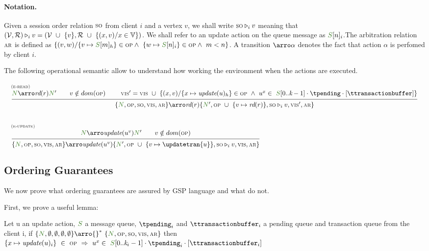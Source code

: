\documentclass[envcountsect,runningheads,orivec]{llncs}
\begin{document}
 \paragraph{Notation.} Given a session order relation $\textsc{\scriptsize{SO}}$ from client $i$ and a vertex $v$, we shall write $\textsc{\scriptsize{SO}}\triangleright_i{v}$  meaning that $(\mathcal{V}, \mathcal{R})\triangleright_i{v} = (\mathcal{V} \ \cup \ \{v\}, \mathcal{R}\ \cup \ \{(x,v) / x \in \mathbb{V}\})$. We shall refer to an update action on the queue message as $\updateinqueuemessage{n}{i}$.The arbitration relation $\textsc{\scriptsize{AR}}$ is defined as $\{ (v,w) / \{v \mapsto \updateinqueuemessage{m}{h}\} \in \op \land \ \{w \mapsto \updateinqueuemessage{n}{i} \} \in \op \land \ m < n \}$. A transition $\arroi{\alpha}$ denotes the fact that action $\alpha$ is perfomed by client $i$.

 
The following operational semantic allow to understand how working the environment when the actions are executed.

 \[
 \begin{array}{l}
		
\mathrule{e-read}{\systemterm \arroi{\readtran{r}} \systemterm' \qquad v \notin 
dom(\op) \qquad \ \vis' = \vis \ \cup \ \{ (x,v) / \{x \mapsto \updatebyclient{h}\} \in \op \ \land \  u^x \in \ \queuemessage[0..\tknown-1] \cdot \tpending \cdot [\ttransactionbuffer] \}}{\environment{\systemterm}{\op}{\so}{\vis}{\arb} \arroi{\readtran{r}} \environment{\systemterm'}{\op \ \cup \ \{v \mapsto \readtran{r}\} }{\soby{\so}{v}}{\vis'}{\arb}}

 \\[35pt]

		\mathrule{e-update}{\systemterm \arroi{\updatevtran{u}{v}} \systemterm' \qquad v \notin 
dom(\op)}{\environment{\systemterm}{\op}{\so}{\vis}{\arb} \arroi{\updatevtran{u}{v}} \environment{\systemterm'}{\op \ \cup \ \{v \mapsto \updatetran{u} \}}{\soby{\so}{v}}{\vis}{\arb}}
 
 \end{array}
 \]

\subsection{Ordering Guarantees}

We now prove what ordering guarantees are assured by GSP language and what do not. 


First, we prove a useful lemma: 
\begin{lemma}\label{lemma:update-ever-belong} Let u an update action, $\queuemessage$ a message queue, $\tpending_i$ and $\ttransactionbuffer_i$ a pending queue and transaction queue from the client i, if $\environment{\systemterm}{\emptyset}{\emptyset}{\emptyset}{\emptyset} \arro{} ^*\ \environment{\systemterm}{\op}{\so}{\vis}{\arb}$ then $\{x \mapsto \updatebyclient{i} \}\ \in \ \op\ \Rightarrow\ u^x \in\  \queuemessage[0..\tknown_i-1] \cdot \tpending_i \cdot [\ttransactionbuffer_i]$

\end{lemma}
\end{document}
